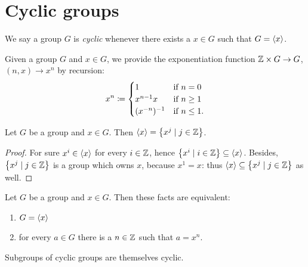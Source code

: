 
\section{Cyclic groups}

\begin{definition}
We say a group \(G\) is {\em cyclic} whenever there exists a \(x \in G\) such that \(G = \left\langle x\right\rangle\).
\end{definition}

\begin{definition}
Given a group \(G\) and \(x \in G\), we provide the exponentiation function \(\mathbb Z \times G \to G\), \((n, x) \to x^n\) by recursion:
\[x^n \coloneq \begin{cases}
1        & \text{if } n = 0 \\
x^{n-1}x & \text{if } n \ge 1 \\
(x^{-n})^{-1}   & \text{if } n \le 1.
\end{cases}\]
\end{definition}

\begin{proposition}
Let \(G\) be a group and \(x \in G\). Then \(\left\langle x\right\rangle = \left\{x^j \mid j \in \mathbb Z\right\}\).
\end{proposition}

\begin{proof}
For sure \(x^i \in \left\langle x\right\rangle\) for every \(i \in \mathbb Z\), hence \(\left\{x^i \mid i \in \mathbb Z\right\} \subseteq \left\langle x\right\rangle\). Besides, \(\left\{x^j \mid j \in \mathbb Z\right\}\) is a group which owns \(x\), because \(x^1 = x\): thus \(\left\langle x\right\rangle \subseteq \left\{x^j \mid j \in \mathbb Z\right\}\) as well.
\end{proof}

\begin{corollary}
Let \(G\) be a group and \(x \in G\). Then these facts are equivalent:
\begin{enumerate}
\item \(G = \left\langle x\right\rangle\)
\item for every \(a \in G\) there is a \(n \in \mathbb Z\) such that \(a = x^n\).
\end{enumerate}
\end{corollary}

\begin{proposition}\label{prop:SubgroupsOfCyclicGroupsAreCyclic}
Subgroups of cyclic groups are themselves cyclic.
\end{proposition}

